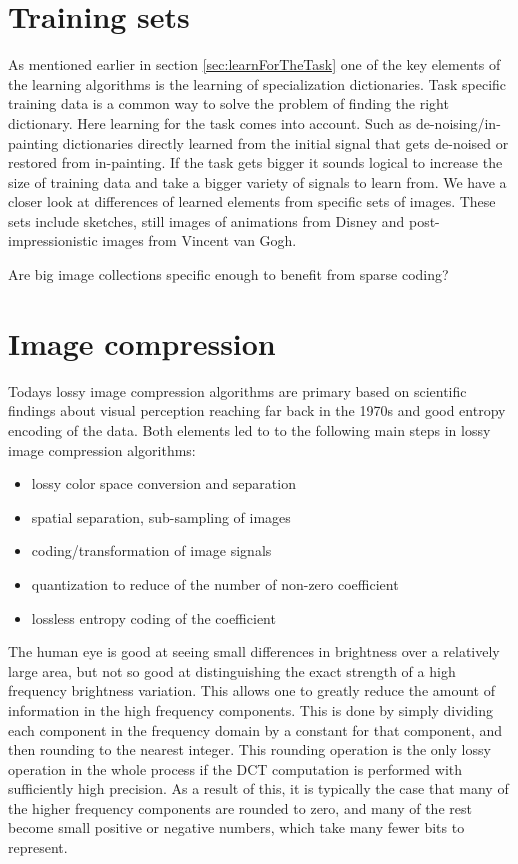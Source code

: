\section{Training sets}
As mentioned earlier in section \ref{sec:learnForTheTask} one of the key
elements  of the learning algorithms is the learning of specialization
dictionaries. Task specific training data is a common way to solve the problem
of finding  the right dictionary. Here learning for the task comes into
account. Such as de-noising/in-painting dictionaries directly learned from the
initial signal that gets de-noised or restored from in-painting. If the task
gets bigger it sounds logical to increase the size of training data and take a
bigger variety of signals to learn from.  We have a closer look at differences
of learned elements from specific sets of images. These sets include sketches,
still images of animations from Disney and post-impressionistic images from
Vincent van Gogh.  

Are big image collections specific enough to benefit from sparse coding?



\section{Image compression}
Todays lossy image compression algorithms are primary based on scientific
findings about visual perception reaching far back in the 1970s\cite{?} and
good entropy encoding of the data. Both elements led to to the
following main steps in lossy image compression algorithms:
\begin{itemize}
 \item lossy color space conversion and separation
 \item spatial separation, sub-sampling of images
 \item coding/transformation of image signals
 \item quantization to reduce of the number of non-zero coefficient 
 \item lossless entropy coding of the coefficient 
\end{itemize}
The human eye is good at seeing small differences in brightness over
a relatively large area, but not so good at distinguishing the exact strength
of a high frequency brightness variation. This allows one to greatly reduce the
amount of information in the high frequency components. This is done by simply
dividing each component in the frequency domain by a constant for that
component, and then rounding to the nearest integer. This rounding operation is
the only lossy operation in the whole process if the DCT computation is
performed with sufficiently high precision. As a result of this, it is
typically the case that many of the higher frequency components are rounded to
zero, and many of the rest become small positive or negative numbers, which
take many fewer bits to represent.

